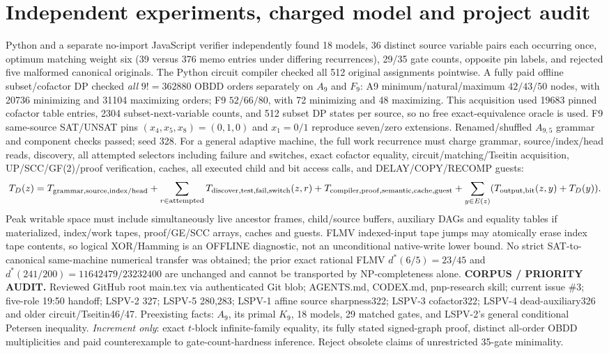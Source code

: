 \documentclass[11pt]{article}
\begin{document}
\section{Independent experiments, charged model and project audit}
Python and a separate no-import JavaScript verifier independently found 18 models, 36 distinct source variable pairs each occurring once, optimum matching weight six (39 versus 376 memo entries under differing recurrences), 29/35 gate counts, opposite pin labels, and rejected five malformed canonical originals. The Python circuit compiler checked all 512 original assignments pointwise. A fully paid offline subset/cofactor DP checked \emph{all} $9!=362880$ OBDD orders separately on $A_9$ and $F_9$: A9 minimum/natural/maximum $42/43/50$ nodes, with 20736 minimizing and 31104 maximizing orders; F9 $52/66/80$, with 72 minimizing and 48 maximizing. This acquisition used 19683 pinned cofactor table entries, 2304 subset-next-variable counts, and 512 subset DP states per source, so no free exact-equivalence oracle is used. F9 same-source SAT/UNSAT pins $(x_4,x_5,x_8)=(0,1,0)$ and $x_1=0/1$ reproduce seven/zero extensions. Renamed/shuffled $A_{9,5}$ grammar and component checks passed; seed 328.
For a general adaptive machine, the full work recurrence must charge grammar, source/index/head reads, discovery, all attempted selectors including failure and switches, exact cofactor equality, circuit/matching/Tseitin acquisition, UP/SCC/GF(2)/proof verification, caches, all executed child and bit access calls, and DELAY/COPY/RECOMP guests:
\[
T_D(z)=T_{\rm grammar,source,index/head}+\sum_{r\in\rm attempted}T_{\rm discover,test,fail,switch}(z,r)+T_{\rm compiler,proof,semantic,cache,guest}+\sum_{y\in E(z)}(T_{\rm output,bit}(z,y)+T_D(y)).
\]
Peak writable space must include simultaneously live ancestor frames, child/source buffers, auxiliary DAGs and equality tables if materialized, index/work tapes, proof/GE/SCC arrays, caches and guests. FLMV indexed-input tape jumps may atomically erase index tape contents, so logical XOR/Hamming is an OFFLINE diagnostic, not an unconditional native-write lower bound. No strict SAT-to-canonical same-machine numerical transfer was obtained; the prior exact rational FLMV $d^*(6/5)=23/45$ and $d^*(241/200)=11642479/23232400$ are unchanged and cannot be transported by NP-completeness alone.
\noindent\textbf{CORPUS / PRIORITY AUDIT.} Reviewed GitHub root main.tex via authenticated Git blob; AGENTS.md, CODEX.md, pnp-research skill; current issue \#3; five-role 19:50 handoff; LSPV-2 327; LSPV-5 280,283; LSPV-1 affine source sharpness322; LSPV-3 cofactor322; LSPV-4 dead-auxiliary326 and older circuit/Tseitin46/47. Preexisting facts: $A_9$, its primal $K_9$, 18 models, 29 matched gates, and LSPV-2's general conditional Petersen inequality. \emph{Increment only}: exact $t$-block infinite-family equality, its fully stated signed-graph proof, distinct all-order OBDD multiplicities and paid counterexample to gate-count-hardness inference. Reject obsolete claims of unrestricted 35-gate minimality.
\end{document}
